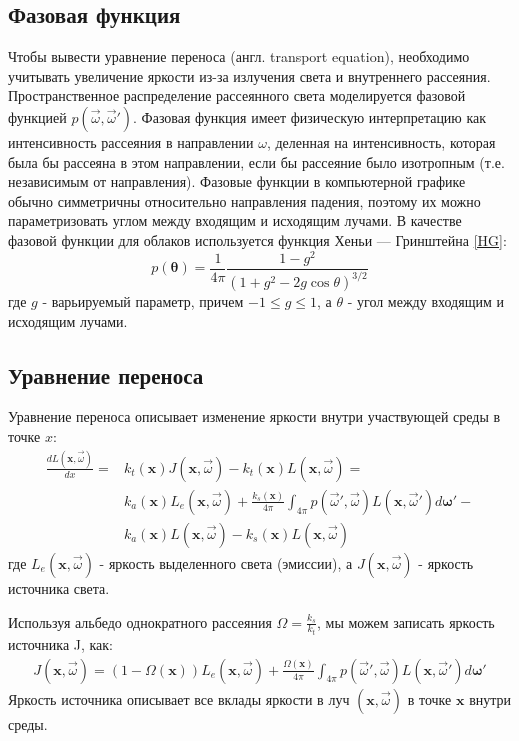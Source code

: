 \subsection{Фазовая функция}
Чтобы вывести уравнение переноса (англ. transport equation), необходимо учитывать увеличение яркости из-за излучения света и внутреннего рассеяния. Пространственное распределение рассеянного света моделируется фазовой функцией $ p(\vec{\omega}, \vec{\omega}') $. Фазовая функция имеет физическую интерпретацию как интенсивность рассеяния в направлении $\omega$, деленная на интенсивность, которая была бы рассеяна в этом направлении, если бы рассеяние было изотропным (т.е. независимым от направления). Фазовые функции в компьютерной графике обычно симметричны относительно направления падения, поэтому их можно параметризовать углом между входящим и исходящим лучами. В качестве фазовой функции для облаков используется функция Хеньи — Гринштейна \eqref{HG}:
\begin{equation}
	\label{HG}
	p(\mathbf{\theta}) = \frac{1}{4\pi} \frac{1 - g^2}{(1 + g^2 - 2g\cos \theta)^{3/2}}
\end{equation}
где $ g $ - варьируемый параметр, причем $ -1 \leq g \leq 1 $, а $\theta$ - угол между входящим и исходящим лучами.

\subsection{Уравнение переноса}
Уравнение переноса описывает изменение яркости внутри участвующей среды в точке $ x $:
\begin{equation}
	\label{rte}
	\begin{aligned}
		\frac{dL(\mathbf{x}, \vec{\omega})}{dx} = & k_t(\mathbf{x}) J(\mathbf{x}, \vec{\omega}) - k_t(\mathbf{x}) L(\mathbf{x}, \vec{\omega})  = \\
		 & k_a(\mathbf{x}) L_e(\mathbf{x}, \vec{\omega}) + \frac{k_s(\mathbf{x})}{4\pi} \int_{4\pi} p(\vec{\omega}', \vec{\omega}) L(\mathbf{x}, \vec{\omega}') d\mathbf{\omega}' - \\
		& k_a(\mathbf{x}) L(\mathbf{x}, \vec{\omega}) - k_s(\mathbf{x}) L(\mathbf{x}, \vec{\omega})	
	\end{aligned}
\end{equation}
где $ L_e(\mathbf{x}, \vec{\omega}) $ - яркость выделенного света (эмиссии), а $ J(\mathbf{x}, \vec{\omega}) $ - яркость источника света. 

Используя альбедо однократного рассеяния $ \Omega = \frac{k_s}{k_t} $, мы можем записать яркость источника J, как:
\begin{equation}
	\label{sourcerad}
	\begin{aligned}
		J(\mathbf{x}, \vec{\omega}) = (1 - \Omega(\mathbf{x})) L_e(\mathbf{x}, \vec{\omega}) + \frac{\Omega(\mathbf{x})}{4\pi} \int_{4\pi} p(\vec{\omega}', \vec{\omega}) L(\mathbf{x}, \vec{\omega}') d\mathbf{\omega}'
	\end{aligned}
\end{equation}
Яркость источника описывает все вклады яркости в луч $ (\mathbf{x}, \vec{\omega}) $ в точке $ \mathbf{x} $ внутри среды. 

